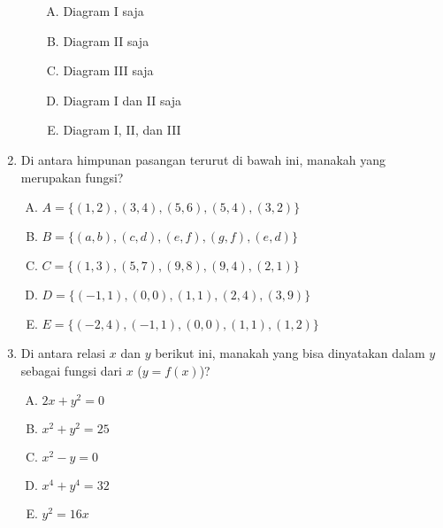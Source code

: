 \documentclass[fleqn, a4paper, 12pt]{article} %
\begin{document}
\begin{enumerate}
\begin{enumerate}[I.]
				\begin{enumerate}[(A)]
					\item Diagram I saja
					\item Diagram II saja
					\item Diagram III saja
					\item Diagram I dan II saja
					\item Diagram I, II, dan III
				\end{enumerate}
			\end{enumerate}
		
		\newpage
		
		\item Di antara himpunan pasangan terurut di bawah ini, manakah yang merupakan fungsi?
			\begin{enumerate}[(A)]
				\item $A = \{(1, 2), (3, 4), (5, 6), (5, 4), (3, 2)\}$
				\item $B = \{(a, b), (c, d), (e, f), (g, f), (e, d)\}$
				\item $C = \{(1, 3), (5, 7), (9, 8), (9, 4), (2, 1)\}$
				\item $D = \{(-1, 1), (0, 0), (1, 1), (2, 4), (3, 9)\}$
				\item $E = \{(-2, 4), (-1, 1), (0, 0), (1, 1), (1, 2)\}$
			\end{enumerate}
		\item Di antara relasi $x$ dan $y$ berikut ini, manakah yang bisa dinyatakan dalam $y$ sebagai fungsi dari $x$ ($y = f(x)$)?
			\begin{enumerate}[(A)]
				\item $2x + y^2 = 0$
				\item $x^2 + y^2 = 25$
				\item $x^2 - y = 0$
				\item $x^4 + y^4 = 32$
				\item $y^2 = 16x$
			\end{enumerate}
		

\end{enumerate}
\end{document}
